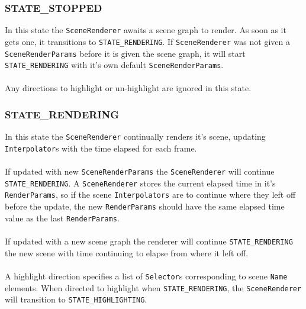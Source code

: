 \documentclass[10pt,aps, prb,preprint]{article}
\begin{document}
\subsubsection{STATE\_STOPPED}
In this state the \texttt{SceneRenderer} awaits a scene graph to render. As soon as it gets one, it transitions to \texttt{STATE\_RENDERING}. If \texttt{SceneRenderer} was not given a \texttt{SceneRenderParams} before it is given the scene graph, it will start \texttt{STATE\_RENDERING} with it's own default \texttt{SceneRenderParams}. 
\\
\\
Any directions to highlight or un-highlight are ignored in this state.

\subsubsection{STATE\_RENDERING} 
In this state the \texttt{SceneRenderer} continually renders it's scene, updating \texttt{Interpolator}s with the time elapsed for each frame. 
\\
\\
If updated with new \texttt{SceneRenderParams} the \texttt{SceneRenderer} will continue \texttt{STATE\_RENDERING}. A \texttt{SceneRenderer} stores the current elapsed time in it's \texttt{RenderParams}, so if the scene \texttt{Interpolators} are to continue where they left off before the update, the new \texttt{RenderParams} should have the same elapsed time value as the last \texttt{RenderParams}. 
\\
\\
If updated with a new scene graph the renderer will continue \texttt{STATE\_RENDERING} the new scene with time continuing to elapse from where it left off.
\\
\\
A highlight direction specifies a list of \texttt{Selector}s corresponding to scene \texttt{Name} elements. When directed to highlight when \texttt{STATE\_RENDERING}, the \texttt{SceneRenderer} will transition to \texttt{STATE\_HIGHLIGHTING}.
\end{document}
